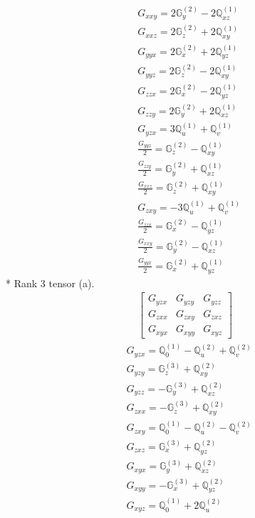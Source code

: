 \documentclass[fleqn,8pt,landscape]{jsarticle}
\begin{document}
\begin{align*}
& G_{xxy} = 2 \mathbb{G}_{y}^{(2)} - 2 \mathbb{Q}_{xz}^{(1)} \\
& G_{xxz} = 2 \mathbb{G}_{z}^{(2)} + 2 \mathbb{Q}_{xy}^{(1)} \\
& G_{yyx} = 2 \mathbb{G}_{x}^{(2)} + 2 \mathbb{Q}_{yz}^{(1)} \\
& G_{yyz} = 2 \mathbb{G}_{z}^{(2)} - 2 \mathbb{Q}_{xy}^{(1)} \\
& G_{zzx} = 2 \mathbb{G}_{x}^{(2)} - 2 \mathbb{Q}_{yz}^{(1)} \\
& G_{zzy} = 2 \mathbb{G}_{y}^{(2)} + 2 \mathbb{Q}_{xz}^{(1)} \\
& G_{yzx} = 3 \mathbb{Q}_{u}^{(1)} + \mathbb{Q}_{v}^{(1)} \\
& \frac{G_{yyz}}{2} = \mathbb{G}_{z}^{(2)} - \mathbb{Q}_{xy}^{(1)} \\
& \frac{G_{zzy}}{2} = \mathbb{G}_{y}^{(2)} + \mathbb{Q}_{xz}^{(1)} \\
& \frac{G_{xxz}}{2} = \mathbb{G}_{z}^{(2)} + \mathbb{Q}_{xy}^{(1)} \\
& G_{zxy} = - 3 \mathbb{Q}_{u}^{(1)} + \mathbb{Q}_{v}^{(1)} \\
& \frac{G_{zzx}}{2} = \mathbb{G}_{x}^{(2)} - \mathbb{Q}_{yz}^{(1)} \\
& \frac{G_{xxy}}{2} = \mathbb{G}_{y}^{(2)} - \mathbb{Q}_{xz}^{(1)} \\
& \frac{G_{yyx}}{2} = \mathbb{G}_{x}^{(2)} + \mathbb{Q}_{yz}^{(1)}
\end{align*}
* Rank 3 tensor (a).
\begin{align*}
\begin{bmatrix} G_{yzx} & G_{yzy} & G_{yzz} \\ G_{zxx} & G_{zxy} & G_{zxz} \\ G_{xyx} & G_{xyy} & G_{xyz} \end{bmatrix}
\end{align*}
\begin{align*}
& G_{yzx} = \mathbb{Q}_{0}^{(1)} - \mathbb{Q}_{u}^{(2)} + \mathbb{Q}_{v}^{(2)} \\
& G_{yzy} = \mathbb{G}_{z}^{(3)} + \mathbb{Q}_{xy}^{(2)} \\
& G_{yzz} = - \mathbb{G}_{y}^{(3)} + \mathbb{Q}_{xz}^{(2)} \\
& G_{zxx} = - \mathbb{G}_{z}^{(3)} + \mathbb{Q}_{xy}^{(2)} \\
& G_{zxy} = \mathbb{Q}_{0}^{(1)} - \mathbb{Q}_{u}^{(2)} - \mathbb{Q}_{v}^{(2)} \\
& G_{zxz} = \mathbb{G}_{x}^{(3)} + \mathbb{Q}_{yz}^{(2)} \\
& G_{xyx} = \mathbb{G}_{y}^{(3)} + \mathbb{Q}_{xz}^{(2)} \\
& G_{xyy} = - \mathbb{G}_{x}^{(3)} + \mathbb{Q}_{yz}^{(2)} \\
& G_{xyz} = \mathbb{Q}_{0}^{(1)} + 2 \mathbb{Q}_{u}^{(2)}
\end{align*}
\end{document}
